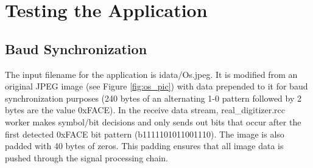 \section{Testing the Application}
\subsection{Baud Synchronization}
The input filename for the application is idata/Os.jpeg. It is modified from an original JPEG image (see Figure \ref{fig:os_pic}) with data prepended to it for baud synchronization purposes (240 bytes of an alternating 1-0 pattern followed by 2 bytes are the value 0xFACE). In the receive data stream, real\_digitizer.rcc worker makes symbol/bit decisions and only sends out bits that occur after the first detected 0xFACE bit pattern (b1111101011001110). The image is also padded with 40 bytes of zeros. This padding ensures that all image data is pushed through the signal processing chain.

